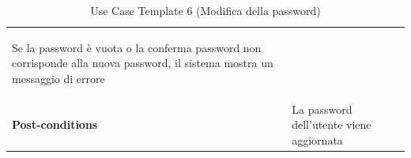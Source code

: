 \documentclass{article}
\begin{document}
\begin{table}
\begin{tabularx}{\textwidth}{|lX|}
\begin{description}[nosep,before=\leavevmode\vspace*{-1\baselineskip},after=\leavevmode\vspace*{-1\baselineskip}]
                                                                        \item [5a.] Se la password è vuota o la conferma password non corrisponde alla nuova password, il sistema mostra un messaggio di errore
                                                                    \end{description} \\
                    \rowcolor{white} \textbf{Post-conditions} & La password dell'utente viene aggiornata \\
                    \toprule
                \end{tabularx}
                \caption{Use Case Template 6 (Modifica della password)}
                \label{tab:use-case-template-6}
            \end{table}
\end{document}
